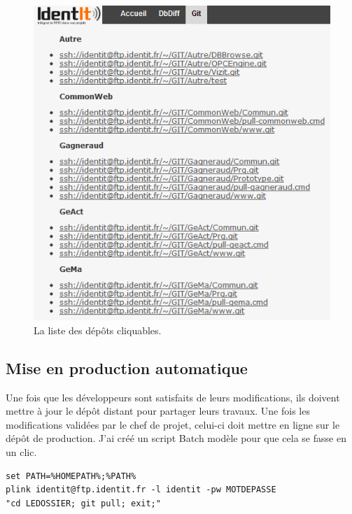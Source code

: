 \begin{figure}
\begin{center}
\includegraphics[scale=0.7]{images/repo.png}
\caption{La liste des dépôts cliquables.}
\label{repo}
\end{center}
\end{figure}

\subsection{Mise en production automatique} %
\label{sub:Mise en production automatique}

Une fois que les développeurs sont satisfaits de leurs modifications, ils
doivent mettre à jour le dépôt distant pour partager leurs travaux. Une fois
les modifications validées par le chef de projet, celui-ci doit mettre en ligne
sur le dépôt de production. J'ai créé un script Batch \og modèle \fg{} pour
que cela se fasse en un clic.\\

\begin{lstlisting}[basicstyle=\ttfamily\small, frame=trBL]
set PATH=%HOMEPATH%;%PATH%
plink identit@ftp.identit.fr -l identit -pw MOTDEPASSE
"cd LEDOSSIER; git pull; exit;"
\end{lstlisting}

